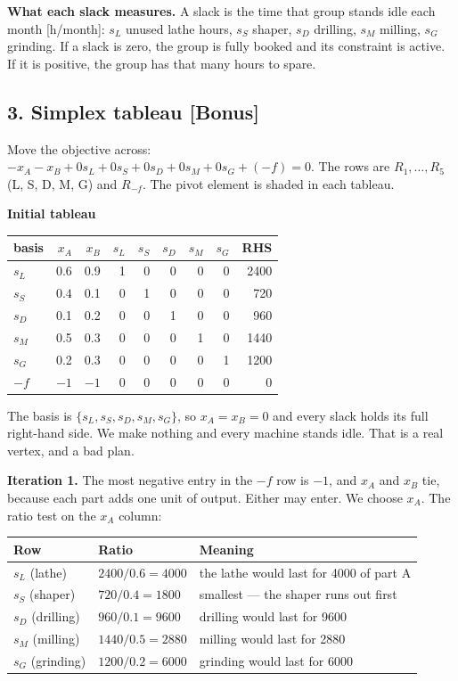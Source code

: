 \documentclass[11pt,a4paper]{article}
\newcommand{\piv}[1]{\colorbox{pivot}{$#1$}}   %
\newenvironment{tableau}[1]
  {\begin{center}\begin{minipage}{\linewidth}\centering\small
   \textbf{#1}\\[0.4em]}
  {\end{minipage}\end{center}}
\begin{document}
\textbf{What each slack measures.} A slack is the time that group stands idle
each month [h/month]: $s_L$ unused lathe hours, $s_S$ shaper, $s_D$ drilling,
$s_M$ milling, $s_G$ grinding. If a slack is zero, the group is fully booked and
its constraint is active. If it is positive, the group has that many hours to
spare.

\subsection*{3. Simplex tableau [Bonus]}

Move the objective across: $-x_A - x_B + 0s_L + 0s_S + 0s_D + 0s_M + 0s_G + (-f) = 0$.
The rows are $R_1,\dots,R_5$ (L, S, D, M, G) and $R_{-f}$. The pivot element is
shaded in each tableau.

\begin{tableau}{Initial tableau}
\begin{tabular}{l|rrrrrrr|r}
basis & $x_A$ & $x_B$ & $s_L$ & $s_S$ & $s_D$ & $s_M$ & $s_G$ & RHS \\
\hline
$s_L$ & 0.6 & 0.9 & 1 & 0 & 0 & 0 & 0 & 2400 \\
$s_S$ & \piv{0.4} & 0.1 & 0 & 1 & 0 & 0 & 0 & 720 \\
$s_D$ & 0.1 & 0.2 & 0 & 0 & 1 & 0 & 0 & 960 \\
$s_M$ & 0.5 & 0.3 & 0 & 0 & 0 & 1 & 0 & 1440 \\
$s_G$ & 0.2 & 0.3 & 0 & 0 & 0 & 0 & 1 & 1200 \\
\hline
$-f$  & $-1$ & $-1$ & 0 & 0 & 0 & 0 & 0 & 0 \\
\end{tabular}
\end{tableau}

The basis is $\{s_L, s_S, s_D, s_M, s_G\}$, so $x_A = x_B = 0$ and every slack
holds its full right-hand side. We make nothing and every machine stands idle.
That is a real vertex, and a bad plan.

\textbf{Iteration 1.} The most negative entry in the $-f$ row is $-1$, and
$x_A$ and $x_B$ tie, because each part adds one unit of output. Either may
enter. We choose $x_A$. The ratio test on the $x_A$ column:

\begin{center}
\begin{tabular}{lll}
\toprule
Row & Ratio & Meaning \\
\midrule
$s_L$ (lathe)    & $2400/0.6 = 4000$ & the lathe would last for 4000 of part A \\
$s_S$ (shaper)   & $720/0.4 = 1800$  & smallest --- the shaper runs out first \\
$s_D$ (drilling) & $960/0.1 = 9600$  & drilling would last for 9600 \\
$s_M$ (milling)  & $1440/0.5 = 2880$ & milling would last for 2880 \\
$s_G$ (grinding) & $1200/0.2 = 6000$ & grinding would last for 6000 \\
\bottomrule
\end{tabular}
\end{center}
\end{document}
